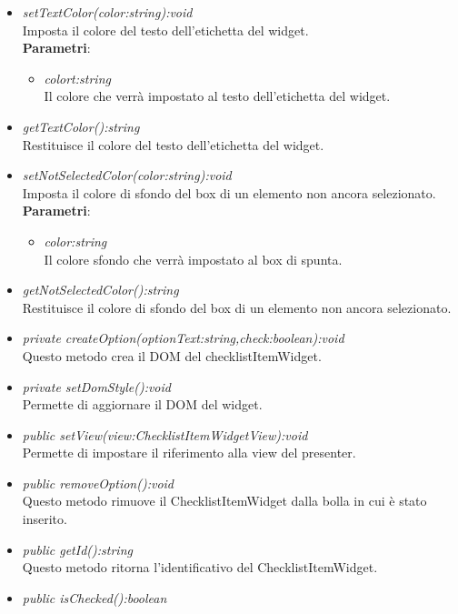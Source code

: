 \begin{itemize}
\begin{itemize}
\begin{itemize}
		\end{itemize}
		\item \textit{setTextColor(color:string):void}\\
		Imposta il colore del testo dell'etichetta del widget.
		\\ \textbf{Parametri}: \begin{itemize}
		\item \textit{colort:string}\\
		Il colore che verrà impostato al testo dell'etichetta del widget.
		\end{itemize}
		\item \textit{getTextColor():string}\\
		Restituisce il colore del testo dell'etichetta del widget.
		\item \textit{setNotSelectedColor(color:string):void}\\
		Imposta il colore di sfondo del box di un elemento non ancora selezionato.
		\\ \textbf{Parametri}: \begin{itemize}
		\item \textit{color:string}\\
		Il colore sfondo che verrà impostato al box di spunta.
		\end{itemize}
		\item \textit{getNotSelectedColor():string}\\
		Restituisce il colore di sfondo del box di un elemento non ancora selezionato.
	\item \textit{private createOption(optionText:string,check:boolean):void}\\
	Questo metodo crea il DOM del checklistItemWidget.
	\item \textit{private setDomStyle():void}\\
	Permette di aggiornare il DOM del widget.
	\item \textit{public setView(view:ChecklistItemWidgetView):void}\\
	Permette di impostare il riferimento alla view del presenter.
	\item \textit{public removeOption():void}\\
	Questo metodo rimuove il ChecklistItemWidget dalla bolla in cui è stato inserito.
	\item \textit{public getId():string}\\
	Questo metodo ritorna l'identificativo del ChecklistItemWidget.
	\item \textit{public isChecked():boolean}\\

\end{itemize}
\end{itemize}
